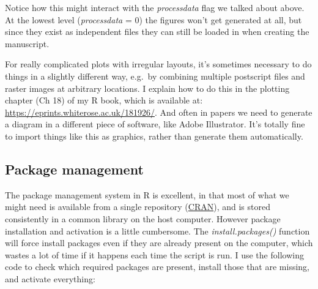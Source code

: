 \documentclass[
]{article}
\begin{document}
Notice how this might interact with the \emph{processdata} flag we talked about above. At the lowest level (\emph{processdata} = 0) the figures won't get generated at all, but since they exist as independent files they can still be loaded in when creating the manuscript.

For really complicated plots with irregular layouts, it's sometimes necessary to do things in a slightly different way, e.g.~by combining multiple postscript files and raster images at arbitrary locations. I explain how to do this in the plotting chapter (Ch 18) of my R book, which is available at: \url{https://eprints.whiterose.ac.uk/181926/}. And often in papers we need to generate a diagram in a different piece of software, like Adobe Illustrator. It's totally fine to import things like this as graphics, rather than generate them automatically.

\hypertarget{package-management}{%
\subsection{Package management}\label{package-management}}

The package management system in R is excellent, in that most of what we might need is available from a single repository (\href{https://cran.r-project.org/}{CRAN}), and is stored consistently in a common library on the host computer. However package installation and activation is a little cumbersome. The \emph{install.packages()} function will force install packages even if they are already present on the computer, which wastes a lot of time if it happens each time the script is run. I use the following code to check which required packages are present, install those that are missing, and activate everything:
\end{document}
